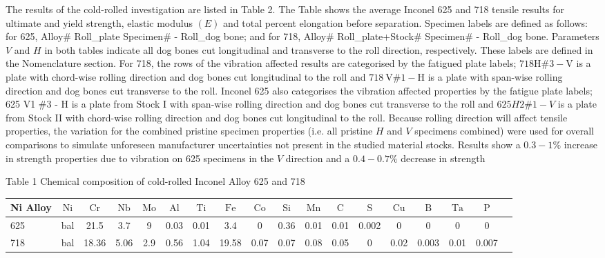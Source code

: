 \documentclass[10pt]{article}
\begin{document}
The results of the cold-rolled investigation are listed in Table 2. The Table shows the average Inconel 625 and 718 tensile results for ultimate and yield strength, elastic modulus $(E)$ and total percent elongation before separation. Specimen labels are defined as follows: for 625, Alloy\# Roll\_plate Specimen\# - Roll\_dog bone; and for 718, Alloy\# Roll\_plate+Stock\# Specimen\# - Roll\_dog bone. Parameters $V$ and $H$ in both tables indicate all dog bones cut longitudinal and transverse to the roll direction, respectively. These labels are defined in the Nomenclature section. For 718, the rows of the vibration affected results are categorised by the fatigued plate labels; $718 \mathrm{H} \# 3-\mathrm{V}$ is a plate with chord-wise rolling direction and dog bones cut longitudinal to the roll and $718 \mathrm{~V} \# 1-\mathrm{H}$ is a plate with span-wise rolling direction and dog bones cut transverse to the roll. Inconel 625 also categorises the vibration affected properties by the fatigue plate labels; 625 V1 \#3 - H is a plate from Stock I with span-wise rolling direction and dog bones cut transverse to the roll and $625 H 2 \# 1-V$ is a plate from Stock II with chord-wise rolling direction and dog bones cut longitudinal to the roll. Because rolling direction will affect tensile properties, the variation for the combined pristine specimen properties (i.e. all pristine $H$ and $V$ specimens combined) were used for overall comparisons to simulate unforeseen manufacturer uncertainties not present in the studied material stocks. Results show a $0.3-1 \%$ increase in strength properties due to vibration on 625 specimens in the $V$ direction and a $0.4-0.7 \%$ decrease in strength

Table 1 Chemical composition of cold-rolled Inconel Alloy 625 and 718

\begin{center}
\begin{tabular}{lccccccccccccccccc}
\hline
Ni Alloy & $\mathrm{Ni}$ & $\mathrm{Cr}$ & $\mathrm{Nb}$ & $\mathrm{Mo}$ & $\mathrm{Al}$ & $\mathrm{Ti}$ & $\mathrm{Fe}$ & $\mathrm{Co}$ & $\mathrm{Si}$ & $\mathrm{Mn}$ & $\mathrm{C}$ & $\mathrm{S}$ & $\mathrm{Cu}$ & $\mathrm{B}$ & $\mathrm{Ta}$ & $\mathrm{P}$ \\
\hline
625 & bal & 21.5 & 3.7 & 9 & 0.03 & 0.01 & 3.4 & 0 & 0.36 & 0.01 & 0.01 & 0.002 & 0 & 0 & 0 & 0 \\
718 & bal & 18.36 & 5.06 & 2.9 & 0.56 & 1.04 & 19.58 & 0.07 & 0.07 & 0.08 & 0.05 & 0 & 0.02 & 0.003 & 0.01 & 0.007 \\
\hline
\end{tabular}
\end{center}
\end{document}
